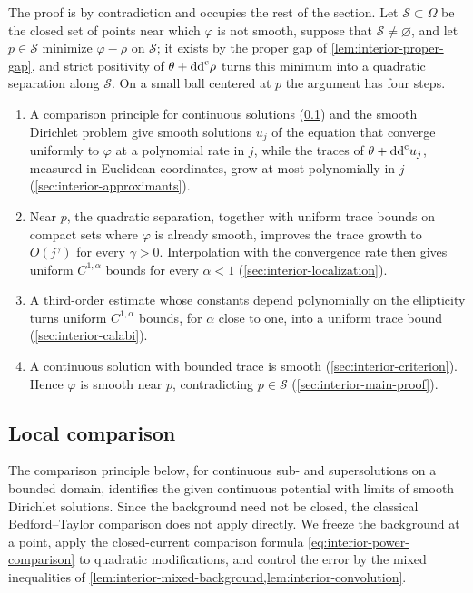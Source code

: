 The proof is by contradiction and occupies the rest of the section. Let $\mathcal S\subset\Omega$ be the closed set of points near which $\varphi$ is not smooth, suppose that $\mathcal S\neq\varnothing$, and let $p\in\mathcal S$ minimize $\varphi-\rho$ on $\mathcal S$; it exists by the proper gap of \cref{lem:interior-proper-gap}, and strict positivity of $\theta+\mathrm{dd}^{\mathrm{c}}\rho$ turns this minimum into a quadratic separation along $\mathcal S$. On a small ball centered at $p$ the argument has four steps.
\begin{enumerate}
\item A comparison principle for continuous solutions (\cref{sec:interior-calculus}) and the smooth Dirichlet problem give smooth solutions $u_j$ of the equation that converge uniformly to $\varphi$ at a polynomial rate in $j$, while the traces of $\theta+\mathrm{dd}^{\mathrm{c}} u_j$, measured in Euclidean coordinates, grow at most polynomially in $j$ (\cref{sec:interior-approximants}).
\item Near $p$, the quadratic separation, together with uniform trace bounds on compact sets where $\varphi$ is already smooth, improves the trace growth to $O(j^\gamma)$ for every $\gamma>0$. Interpolation with the convergence rate then gives uniform $C^{1,\alpha}$ bounds for every $\alpha<1$ (\cref{sec:interior-localization}).
\item A third-order estimate whose constants depend polynomially on the ellipticity turns uniform $C^{1,\alpha}$ bounds, for $\alpha$ close to one, into a uniform trace bound (\cref{sec:interior-calabi}).
\item A continuous solution with bounded trace is smooth (\cref{sec:interior-criterion}). Hence $\varphi$ is smooth near $p$, contradicting $p\in\mathcal S$ (\cref{sec:interior-main-proof}).
\end{enumerate}

\subsection{Local comparison}\label{sec:interior-calculus}

The comparison principle below, for continuous sub- and supersolutions on a bounded domain, identifies the given continuous potential with limits of smooth Dirichlet solutions. Since the background need not be closed, the classical Bedford--Taylor comparison does not apply directly. We freeze the background at a point, apply the closed-current comparison formula \eqref{eq:interior-power-comparison} to quadratic modifications, and control the error by the mixed inequalities of \cref{lem:interior-mixed-background,lem:interior-convolution}.

